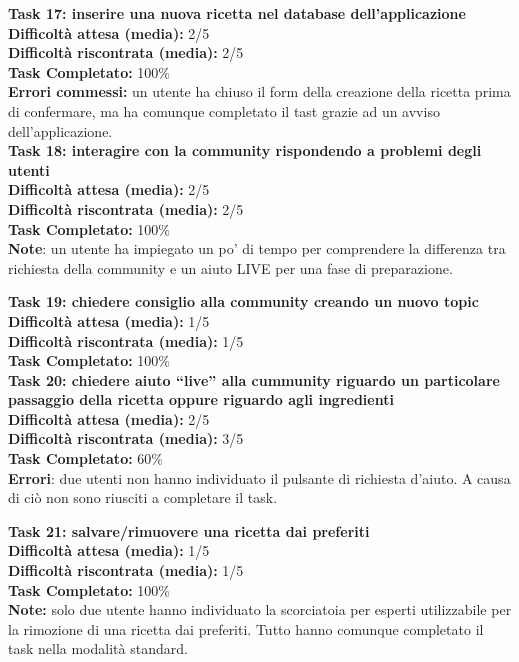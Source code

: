 \begin{itemize}
\textbf{Task 17: inserire una nuova ricetta nel database
dell'applicazione}\\
\textbf{Difficoltà attesa (media):} 2/5\\
\textbf{Difficoltà riscontrata (media):} 2/5\\
\textbf{Task Completato:} 100\%\\
\textbf{Errori commessi:} un utente ha chiuso il form della creazione
della ricetta prima di confermare, ma ha comunque completato il tast
grazie ad un avviso dell'applicazione.\\

\textbf{Task 18: interagire con la community rispondendo a problemi
degli utenti}\\
\textbf{Difficoltà attesa (media):} 2/5\\
\textbf{Difficoltà riscontrata (media):} 2/5\\
\textbf{Task Completato:} 100\%\\
\textbf{Note}: un utente ha impiegato un po' di tempo per comprendere la
differenza tra richiesta della community e un aiuto LIVE per una fase di
preparazione.

\textbf{Task 19: chiedere consiglio alla community creando un nuovo
topic}\\
\textbf{Difficoltà attesa (media):} 1/5\\
\textbf{Difficoltà riscontrata (media):} 1/5\\
\textbf{Task Completato:} 100\%\\

\textbf{Task 20: chiedere aiuto ``live'' alla cummunity riguardo un
particolare passaggio della ricetta oppure riguardo agli ingredienti}\\
\textbf{Difficoltà attesa (media):} 2/5\\
\textbf{Difficoltà riscontrata (media):} 3/5\\
\textbf{Task Completato:} 60\%\\
\textbf{Errori}: due utenti non hanno individuato il pulsante di
richiesta d'aiuto. A causa di ciò non sono riusciti a completare il
task.

\textbf{Task 21: salvare/rimuovere una ricetta dai preferiti}\\
\textbf{Difficoltà attesa (media):} 1/5\\
\textbf{Difficoltà riscontrata (media):} 1/5\\
\textbf{Task Completato:} 100\%\\
\textbf{Note:} solo due utente hanno individuato la scorciatoia per
esperti utilizzabile per la rimozione di una ricetta dai preferiti.
Tutto hanno comunque completato il task nella modalità standard.


\end{itemize}
